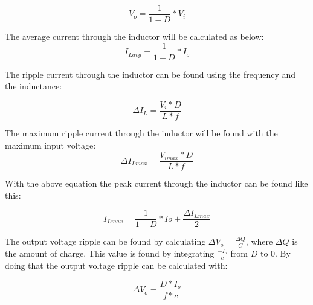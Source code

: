 \begin{equation}
V_o = \frac{1}{1-D}*V_i
\end{equation}
 
The average current through the inductor will be calculated as below:
\begin{equation}
I_{Lavg} = \frac{1}{1-D}*I_o
\end{equation}

The ripple current through the inductor can be found using the frequency and the inductance:

\begin{equation}
\Delta I_L = \frac{V_i*D}{L*f}
\end{equation}

The maximum ripple current through the inductor will be found with the maximum input voltage:
\begin{equation}
\Delta I_{Lmax} = \frac{V_{imax}*D}{L*f}
\end{equation}

With the above equation the peak current through the inductor can be found like this:

\begin{equation}
I_{Lmax} = \frac{1}{1-D}*Io+\frac{\Delta I_{Lmax}}{2}
\end{equation}

 The output voltage ripple can be found by calculating $\Delta V_o = \frac{\Delta Q}{C}$, where $\Delta Q$ is the amount of charge. This value is found by integrating $\frac{-I_o}{c}$ from $D$ to $0$. By doing that the output voltage ripple can be calculated with:

\begin{equation}
\Delta V_o = \frac{D*I_o}{f*c}
\end{equation}
